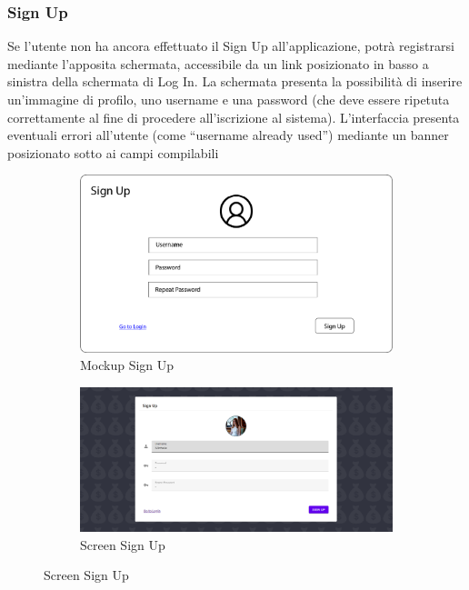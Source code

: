 \documentclass{report}
\begin{document}
\subsubsection{Sign Up}
Se l’utente non ha ancora effettuato il Sign Up all’applicazione, potrà registrarsi mediante l’apposita schermata, accessibile da un link posizionato in basso a sinistra della schermata di Log In.
\newline
La schermata presenta la possibilità di inserire un’immagine di profilo, uno username e una password (che deve essere ripetuta correttamente al fine di procedere all’iscrizione al sistema).
\newline
L’interfaccia presenta eventuali errori all’utente (come “username already used”) mediante un banner posizionato sotto ai campi compilabili
\begin{figure}[H]
    \begin{subfigure}
        \centering
        \includegraphics[scale=0.3]{images/mockups/Sign Up.png}
        \caption{Mockup Sign Up}
    \end{subfigure}
    \par\bigskip
    \begin{subfigure}
        \centering
        \includegraphics[scale=0.35]{images/screens/Sign Up.png}
        \caption{Screen Sign Up}
    \end{subfigure}
\end{figure}
\end{document}
